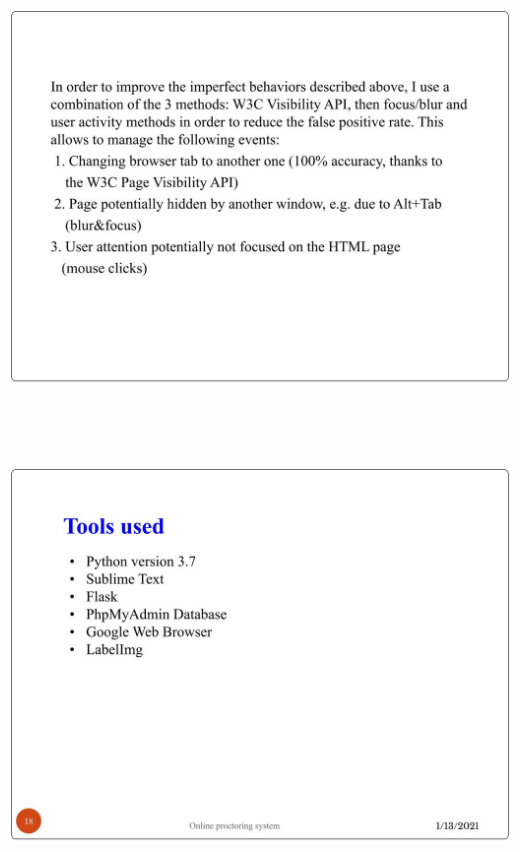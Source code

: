 \documentclass[12pt]{report}
\begin{document}
\includegraphics[width=17cm,height=12cm]{INTERNSHIP SAMPLE PRESENTATION (16)}\\
\includegraphics[width=17cm,height=12cm]{INTERNSHIP SAMPLE PRESENTATION (17)}\\
\end{document}
